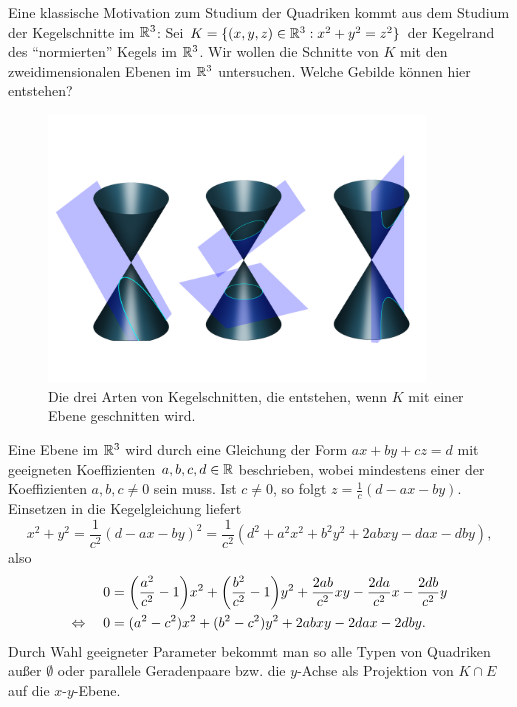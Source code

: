 \begin{beispiel}[Kegelschnitte, $n = 3$]
	\label{bsp:8.10}
	Eine klassische Motivation zum Studium der Quadriken kommt aus dem Studium der Kegelschnitte im $\mathbb{R}^3$:
	Sei $K = \{(x,y,z) \in \mathbb{R}^3 : x^2 + y^2 = z^2 \}$ der Kegelrand des \enquote{normierten} Kegels im $\mathbb{R}^3$.
	Wir wollen die Schnitte von $K$ mit den zweidimensionalen Ebenen im $\mathbb{R}^3$ untersuchen.
	Welche Gebilde können hier entstehen?
	  
	\begin{figure}[h]
		\centering
		\includegraphics[keepaspectratio,width=10cm]{img/conic_sections.pdf}
		\caption{Die drei Arten von Kegelschnitten, die entstehen, wenn $K$ mit einer Ebene geschnitten wird. \cite{conic}}
	\end{figure}

	Eine Ebene im $\mathbb{R}^3$ wird durch eine Gleichung der Form $ax + by + cz = d$ mit geeigneten Koeffizienten $a,b,c,d \in \mathbb{R}$ beschrieben, wobei mindestens einer der Koeffizienten $a,b,c \neq 0$ sein muss.
	Ist $c \neq 0$, so folgt $z = \frac{1}{c} (d-ax-by)$.
	Einsetzen in die Kegelgleichung liefert
	\[
		x^2 + y^2 = \frac{1}{c^2} (d-ax-by)^2 = \frac{1}{c^2}(d^2 + a^2x^2 + b^2y^2 + 2abxy - dax - dby),
	\]
	also
	\begin{align*}
		0 &= \enb{\frac{a^2}{c^2}-1}x^2 + \enb{\frac{b^2}{c^2}-1}y^2 + \frac{2ab}{c^2} xy - \frac{2da}{c^2}x - \frac{2db}{c^2}y \\
		\Leftrightarrow \quad 0 &=(a^2-c^2)x^2 + (b^2-c^2)y^2 + 2abxy - 2dax - 2dby.
	\end{align*}
	Durch Wahl geeigneter Parameter bekommt man so alle Typen von Quadriken außer $\emptyset$ oder parallele Geradenpaare bzw. die $y$-Achse als Projektion von $K \cap E$ auf die $x$-$y$-Ebene.
\end{beispiel}
\cleardoubleoddemptypage